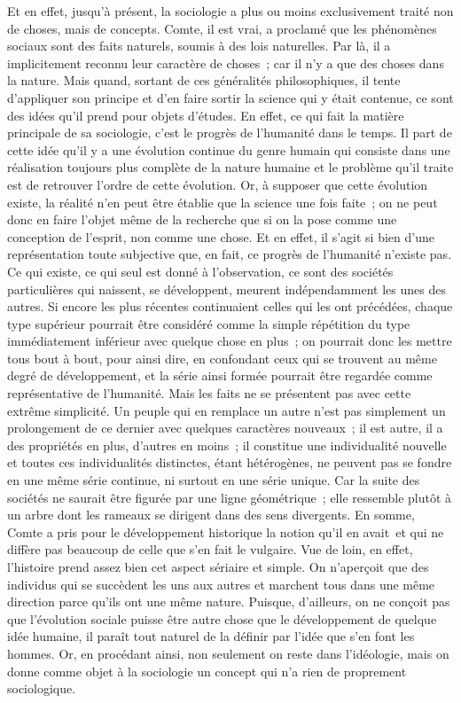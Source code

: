 \documentclass[french,twoside]{book} %
\begin{document}
Et en effet, jusqu’à présent, la sociologie a plus ou moins exclusivement traité non de choses, mais de concepts. Comte, il est vrai, a proclamé que les phénomènes sociaux sont des faits naturels, soumis à des lois naturelles. Par là, il a implicitement reconnu leur caractère de choses ; car il n’y a que des choses dans la nature. Mais quand, sortant de ces généralités philosophiques, il tente d’appliquer son principe et d’en faire sortir la science qui y était contenue, ce sont des idées qu’il prend pour objets d’études. En effet, ce qui fait la matière principale de sa sociologie, c’est le progrès de l’humanité dans le temps. Il part de cette idée qu’il y a une évolution continue du genre humain qui consiste dans une réalisation toujours plus complète de la nature humaine et le problème qu’il traite est de retrouver l’ordre de cette évolution. Or, à supposer que cette évolution existe, la réalité n’en peut être établie que la science une fois faite ; on ne peut donc en faire l’objet même de la recherche que si on la pose comme une conception de l’esprit, non comme une chose. Et en effet, il s’agit si bien d’une représentation toute subjective que, en fait, ce progrès de l’humanité n’existe pas. Ce qui existe, ce qui seul est donné à l’observation, ce sont des sociétés particulières qui naissent, se développent, meurent indépendamment les unes des autres. Si encore les plus récentes continuaient celles qui les ont précédées, chaque type supérieur pourrait être considéré comme la simple répétition du type immédiatement inférieur avec quelque chose en plus ; on pourrait donc les mettre tous bout à bout, pour ainsi dire, en confondant ceux qui se trouvent au même degré de développement, et la série ainsi formée pourrait être regardée comme représentative de l’humanité. Mais les faits ne se présentent pas avec cette extrême simplicité. Un peuple qui en remplace un autre n’est pas simplement un prolongement de ce dernier avec quelques caractères nouveaux ; il est autre, il a des propriétés en plus, d’autres en moins ; il constitue une individualité nouvelle et toutes ces individualités distinctes, étant hétérogènes, ne peuvent pas se fondre en une même série continue, ni surtout en une série unique. Car la suite des sociétés ne saurait être figurée par une ligne géométrique ; elle ressemble plutôt à un arbre dont les rameaux se dirigent dans des sens divergents. En somme, Comte a pris pour le développement historique la notion qu’il en avait et qui ne diffère pas beaucoup de celle que s’en fait le vulgaire. Vue de loin, en effet, l’histoire prend assez bien cet aspect sériaire et simple. On n’aperçoit que des individus qui se succèdent les uns aux autres et marchent tous dans une même direction parce qu’ils ont une même nature. Puisque, d’ailleurs, on ne conçoit pas que l’évolution sociale puisse être autre chose que le développement de quelque idée humaine, il paraît tout naturel de la définir par l’idée que s’en font les hommes. Or, en procédant ainsi, non seulement on reste dans l’idéologie, mais on donne comme objet à la sociologie un concept qui n’a rien de proprement sociologique.\par
\end{document}
